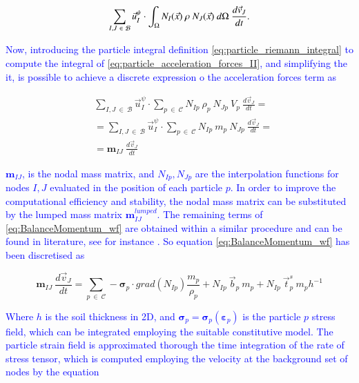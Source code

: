 \documentclass[preprint,12pt,a4paper]{elsarticle}
\newcommand{\tens}[1]{
  \ensuremath{\mathbf{{#1}}}
}
\newcommand\Grad[1]{grad({#1})}
\newcommand{\Integral}[2]{
  \IfStrEqCase{#1}{
    {2}{\ensuremath{\int_{\Gamma_d}{#2}\ d\Gamma}}
    {3}{\ensuremath{\int_{\Omega}{#2}\ d\Omega}}
  }
}
\newcommand{\MODIFIED}[1]{
  \textcolor{blue}{{#1}}
}
\begin{document}
\begin{equation}
    \label{eq:particle_acceleration_forces_II}
    \sum_{I,J\ \in\ \mathcal{B}} \vec{u}_I^{\psi} \cdot \Integral{3}{ N_I(\vec{x})\ \rho\ N_J(\vec{x})}\ \frac{d\vec{v}_J}{dt}.
\end{equation}
\MODIFIED{Now, introducing the particle integral definition \eqref{eq:particle_riemann_integral} to compute the integral of \eqref{eq:particle_acceleration_forces_II}, and simplifying the it, is possible to achieve a discrete expression o the acceleration forces term as}
\begin{equation}
\label{eq:particle_acceleration_forces_III}
\begin{split}
&\sum_{I,J\ \in\ \mathcal{B}} \vec{u}_I^{\psi} \cdot \sum_{p\ \in\ \mathcal{C}} N_{Ip}\ \rho_p\ N_{Jp}\ V_p\ \frac{d\vec{v}_J}{dt} = \\
&= \sum_{I,J\ \in\ \mathcal{B}} \vec{u}_I^{\psi} \cdot \sum_{p\ \in\ \mathcal{C}} N_{Ip}\ m_p\ N_{Jp}\ \frac{d\vec{v}_J}{dt} = \\
&= \tens{m}_{IJ}\ \frac{d\vec{v}_J}{dt}
\end{split}
\end{equation}
\MODIFIED{$\tens{m}_{IJ}$, is the nodal mass matrix, and $N_{Ip}, N_{Jp}$ are the interpolation functions for nodes $I,J$ evaluated in the position of each particle $p$. In order to improve the computational efficiency and stability, the nodal mass matrix can be substituted by the lumped mass matrix $\tens{m}_{IJ}^{lumped}$. The remaining terms of \eqref{eq:BalanceMomentum_wf} are obtained within a similar procedure and can be found in literature, see for instance \cite{Zhang_book_2016}.
So equation \eqref{eq:BalanceMomentum_wf} has been discretised as}
\begin{equation}
\label{eq:BalanceMomentum_wf_discretized}
    \tens{m}_{IJ}\ \frac{d\vec{v}_J}{dt} = \sum_{p\ \in\ \mathcal{C}} - \tens{\sigma}_{p} \cdot \Grad{N_{Ip}} \frac{m_p}{\rho_p} + N_{Ip}\ \vec{b}_{p}\ m_p  + N_{Ip}\ \vec{t}^s_{p}\ m_p h^{-1}
\end{equation}
\MODIFIED{Where $h$ is the soil thickness in 2D, and $\tens{\sigma}_{p} = \tens{\sigma}_{p}(\tens{\varepsilon}_{p})$
is the particle $p$ stress field, which can be integrated employing
the suitable constitutive model. The particle strain field is approximated thorough the time integration of the rate of stress tensor, which is computed employing the velocity at the background set of nodes by the equation}
\end{document}
